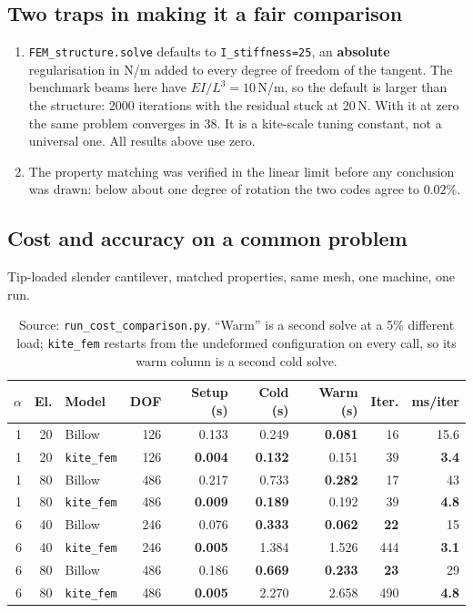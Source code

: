 \documentclass[11pt,a4paper]{article}
\newcommand{\code}[1]{\texttt{\small #1}}
\begin{document}
\subsection{Two traps in making it a fair comparison}

\begin{enumerate}
\item \code{FEM\_structure.solve} defaults to \code{I\_stiffness=25}, an
\textbf{absolute} regularisation in N/m added to every degree of freedom of the
tangent. The benchmark beams here have $EI/L^3 = 10$\,N/m, so the default is
larger than the structure: 2000 iterations with the residual stuck at 20\,N.
With it at zero the same problem converges in 38. It is a kite-scale tuning
constant, not a universal one. All results above use zero.
\item The property matching was verified in the linear limit before any
conclusion was drawn: below about one degree of rotation the two codes agree to
$0.02\%$.
\end{enumerate}

\subsection{Cost and accuracy on a common problem}

Tip-loaded slender cantilever, matched properties, same mesh, one machine, one
run.

\begin{table}[H]
\centering
\small
\caption{Source: \code{run\_cost\_comparison.py}. ``Warm'' is a second solve at
a 5\% different load; \code{kite\_fem} restarts from the undeformed
configuration on every call, so its warm column is a second cold solve.}
\begin{tabular}{rrlrrrrrr}
\toprule
$\alpha$ & El. & Model & DOF & Setup (s) & Cold (s) & Warm (s) & Iter. & ms/iter\\
\midrule
1 & 20 & Billow           & 126 & 0.133 & 0.249 & \textbf{0.081} & 16 & 15.6\\
1 & 20 & \code{kite\_fem} & 126 & \textbf{0.004} & \textbf{0.132} & 0.151 & 39 & \textbf{3.4}\\
1 & 80 & Billow           & 486 & 0.217 & 0.733 & \textbf{0.282} & 17 & 43\\
1 & 80 & \code{kite\_fem} & 486 & \textbf{0.009} & \textbf{0.189} & 0.192 & 39 & \textbf{4.8}\\
6 & 40 & Billow           & 246 & 0.076 & \textbf{0.333} & \textbf{0.062} & \textbf{22} & 15\\
6 & 40 & \code{kite\_fem} & 246 & \textbf{0.005} & 1.384 & 1.526 & 444 & \textbf{3.1}\\
6 & 80 & Billow           & 486 & 0.186 & \textbf{0.669} & \textbf{0.233} & \textbf{23} & 29\\
6 & 80 & \code{kite\_fem} & 486 & \textbf{0.005} & 2.270 & 2.658 & 490 & \textbf{4.8}\\
\bottomrule
\end{tabular}
\end{table}
\end{document}
